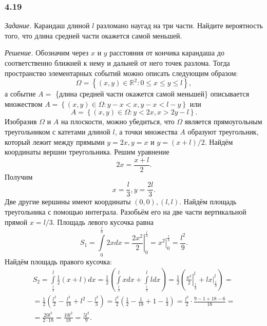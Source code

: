 \subsubsection*{4.19}

\textit{Задание.} Карандаш длиной $l$ разломано наугад на три части.
Найдите вероятность того, что длина средней части окажется самой меньшей.

\textit{Решение.} Обозначим через $x$ и $y$ расстояния от кончика карандаша до соответственно ближней к нему и дальней от него точек разлома.
Тогда пространство элементарных событий можно описать следующим образом:
$$ \Omega =
\left\{ \left( x, y \right) \in \mathbb{R}^2:
0 \leq x \leq y \leq l \right\},$$
а событие $A =$
\{длина средней части окажется самой меньшей\} описывается множеством $A = \left\{ \left( x, y \right) \in \Omega: y - x < x, y - x < l - y \right\} $ или
$$A =
\left\{ \left( x, y \right) \in \Omega:
y < 2x,
x > 2y - l \right\}.$$ 
Изобразив $ \Omega $ и $A$ на плоскости,
можно убедиться,
что $ \Omega $ является прямоугольным треугольником с катетами длиной $l$,
а точки множества $A$ образуют треугольник, который лежит между прямыми $y = 2x, y = x$ и $y = \left( x+l \right) /2$.
Найдём координаты вершин треугольника.
Решим уравнение
$$2x = \frac{x+l}{2}.$$
Получим
$$x = \frac{l}{3}, y = \frac{2l}{3}.$$
Две другие вершины имеют координаты $ \left( 0, 0 \right), \left( l, l \right)$.
Найдём площадь треугольника с помощью интеграла.
Разобьём его на две части вертикальной прямой $x = l/3$.
Площадь левого кусочка равна 
$$S_1 =
\int \limits_{0}^{ \frac{l}{3} } 2 x dx =
\left. \frac{2x^2}{2} \right|_0^{ \frac{l}{3} } =
\left. x^2 \right|_0^{ \frac{l}{3} } =
\frac{l^2}{9}.$$
Найдём площадь правого кусочка:
\begin{equation*}
\begin{split}
S_2 =
\int \limits_{ \frac{l}{3} }^l \frac{1}{2} \left( x+l \right) dx =
\frac{1}{2} \left( \int \limits_{ \frac{l}{3} }^l x dx + \int \limits_{ \frac{l}{3} }^l l dx \right) =
\frac{1}{2} \left( \left. \frac{x^2}{2} \right|_{ \frac{l}{3} }^l + \left. lx \right|_{ \frac{l}{3} }^l \right) = \\
= \frac{1}{2} \left( \frac{l^2}{2} - \frac{l^2}{18} + l^2 - \frac{l^2}{3} \right) =
\frac{l^2}{2} \left( \frac{1}{2} - \frac{1}{18} + 1 - \frac{1}{3} \right) =
\frac{l^2}{2} \cdot \frac{9-1+18-6}{18} = \\
= \frac{20 l^2}{2 \cdot 18} =
\frac{10 l^2}{18} =
\frac{5 l^2}{9}.
\end{split}
\end{equation*}

